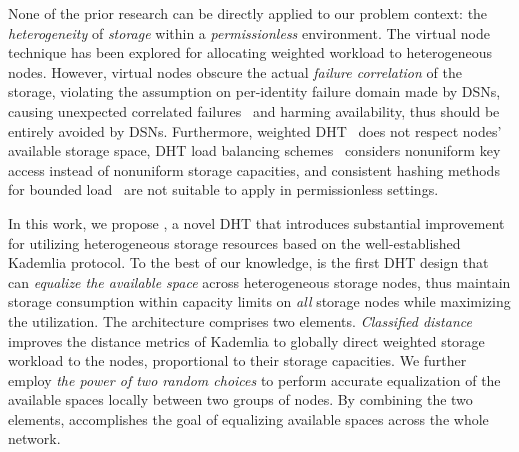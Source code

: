 \ifspace
None of the prior research can be directly applied to our problem context: the \emph{heterogeneity} of \emph{storage} within a \emph{permissionless} environment.
The virtual node technique has been explored for allocating weighted workload to heterogeneous nodes.
However, virtual nodes obscure the actual \emph{failure correlation} of the storage, violating the assumption on per-identity failure domain made by DSNs, causing unexpected correlated failures~\cite{filecoin_loss} and harming availability, thus should be entirely avoided by DSNs.
Furthermore, weighted DHT~\cite{schindelhauer2005weighted} does not respect nodes' available storage space, DHT load balancing schemes~\cite{karger2004simple,misra2004clash} considers nonuniform key access instead of nonuniform storage capacities, and consistent hashing methods for bounded load~\cite{mirrokni2018consistent,chen2021revisiting} are not suitable to apply in permissionless settings.
 
 
\fi

In this work, we propose \dht, a novel DHT that introduces substantial improvement for utilizing heterogeneous storage resources based on the well-established Kademlia protocol.
To the best of our knowledge, \dht is the first DHT design that can \emph{equalize the available space} across heterogeneous storage nodes, thus maintain storage consumption within capacity limits on \emph{all} storage nodes while maximizing the utilization.
The \dht architecture comprises two elements.
 
\emph{Classified distance} improves the distance metrics of Kademlia to globally direct weighted storage workload to the nodes, proportional to their storage capacities.
We further employ \emph{the power of two random choices} to perform accurate equalization of the available spaces locally between two groups of nodes.
By combining the two elements, \dht accomplishes the goal of equalizing available spaces across the whole network.

